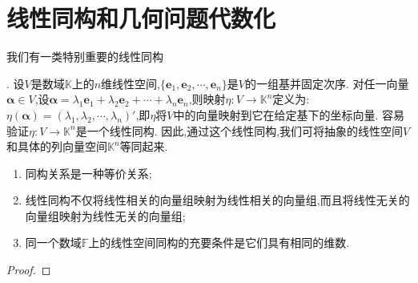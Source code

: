 \documentclass[../../main.tex]{subfiles}%
\begin{document}
\section{线性同构和几何问题代数化}

\hypertarget{线性同构1}{我们有一类特别重要的线性同构}. 设\(V\)是数域\(\mathbb{K}\)上的\(n\)维线性空间,\(\{\boldsymbol{e}_1,\boldsymbol{e}_2,\cdots,\boldsymbol{e}_n\}\)是\(V\)的一组基并固定次序. 对任一向量\(\boldsymbol{\alpha}\in V\),设\(\boldsymbol{\alpha}=\lambda_1\boldsymbol{e}_1+\lambda_2\boldsymbol{e}_2+\cdots+\lambda_n\boldsymbol{e}_n\),则映射\(\eta:V\to\mathbb{K}^n\)定义为:\(\eta(\boldsymbol{\alpha})=(\lambda_1,\lambda_2,\cdots,\lambda_n)'\),即\(\eta\)将\(V\)中的向量映射到它在给定基下的坐标向量. 容易验证\(\eta:V\to\mathbb{K}^n\)是一个线性同构. 因此,通过这个线性同构,我们可将抽象的线性空间\(V\)和具体的列向量空间\(\mathbb{K}^n\)等同起来.

\begin{theorem}\label{theorem:线性空间的同构}
\begin{enumerate}[(1)]
\item 同构关系是一种等价关系;
\item 线性同构不仅将线性相关的向量组映射为线性相关的向量组,而且将线性无关的向量组映射为线性无关的向量组;
\item 同一个数域\(\mathbb{F}\)上的线性空间同构的充要条件是它们具有相同的维数.
\end{enumerate}
\end{theorem}
\begin{proof}

\end{proof}
\end{document}
